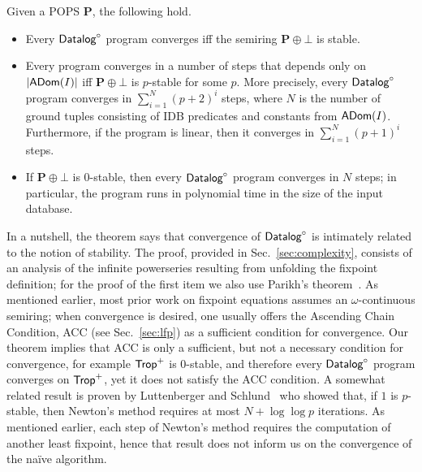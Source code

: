 \begin{thm} \label{th:main:intro} Given a POPS $\bm P$, the following hold.
  \begin{itemize}
  \item Every $\text{\sf Datalog}^\circ$ program converges iff the semiring $\bm P\oplus \bot$ is stable.
  \item Every program converges in a number of steps that depends only
    on $|\textsf{ADom}(I)|$ iff $\bm P \oplus \bot$ is $p$-stable for some
    $p$.  More precisely, every $\text{\sf Datalog}^\circ$ program converges in
    $\sum_{i=1}^{N}(p+2)^i$ steps, where $N$ is the number of ground
    tuples consisting of IDB predicates and constants from $\textsf{ADom}(I)$.
    Furthermore, if the program is linear, then it converges in $\sum_{i=1}^N(p+1)^i$ steps.
  \item If $\bm P\oplus \bot$ is $0$-stable, then every $\text{\sf Datalog}^\circ$
    program converges in $N$ steps; in particular, the program runs in
    polynomial time in the size of the input database.
  \end{itemize}
\end{thm}

In a nutshell, the theorem says that convergence of $\text{\sf Datalog}^\circ$ is
intimately related to the notion of stability.  The proof, provided in
Sec.~\ref{sec:complexity}, consists of an analysis of the infinite
powerseries resulting from unfolding the fixpoint definition; for
the proof of the first item we also use Parikh's
theorem~\cite{MR209093}.  As mentioned earlier, most prior work on
fixpoint equations assumes an $\omega$-continuous semiring; when
convergence is desired, one usually offers the Ascending Chain
Condition, ACC (see Sec.~\ref{sec:lfp}) as a sufficient condition for
convergence.  Our theorem implies that ACC is only a sufficient, but
not a necessary condition for convergence, for example $\text{\sf Trop}^+$ is
$0$-stable, and therefore every $\text{\sf Datalog}^\circ$ program converges on
$\text{\sf Trop}^+$, yet it does not satisfy the ACC condition.  A somewhat
related result is proven by Luttenberger and
Schlund~\cite{DBLP:journals/iandc/LuttenbergerS16} who showed that, if
$1$ is $p$-stable, then Newton's method requires at most
$N + \log\log p$ iterations.  As mentioned earlier, each step of
Newton's method requires the computation of another least fixpoint,
hence that result does not inform us on the convergence of the na\"ive
algorithm.

